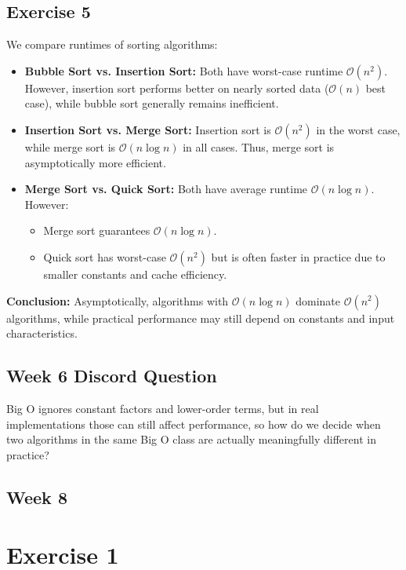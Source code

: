 \documentclass{article}
\theoremstyle{theorem}
\theoremstyle{definition}
\theoremstyle{remark}
\begin{document}
\subsection*{Exercise 5}

We compare runtimes of sorting algorithms:

\begin{itemize}
    \item \textbf{Bubble Sort vs. Insertion Sort:}  
    Both have worst-case runtime $\mathcal{O}(n^2)$. However, insertion sort performs better on nearly sorted data ($\mathcal{O}(n)$ best case), while bubble sort generally remains inefficient.

    \item \textbf{Insertion Sort vs. Merge Sort:}  
    Insertion sort is $\mathcal{O}(n^2)$ in the worst case, while merge sort is $\mathcal{O}(n \log n)$ in all cases. Thus, merge sort is asymptotically more efficient.

    \item \textbf{Merge Sort vs. Quick Sort:}  
    Both have average runtime $\mathcal{O}(n \log n)$. However:
    \begin{itemize}
        \item Merge sort guarantees $\mathcal{O}(n \log n)$.
        \item Quick sort has worst-case $\mathcal{O}(n^2)$ but is often faster in practice due to smaller constants and cache efficiency.
    \end{itemize}
\end{itemize}

\textbf{Conclusion:}  
Asymptotically, algorithms with $\mathcal{O}(n \log n)$ dominate $\mathcal{O}(n^2)$ algorithms, while practical performance may still depend on constants and input characteristics.

\subsection*{Week 6 Discord Question}
Big O ignores constant factors and lower-order terms, but in real implementations those can still affect performance, so how do we decide when two algorithms in the same Big O class are actually meaningfully different in practice?

\subsection{Week 8}
\section*{Exercise 1}
\end{document}
